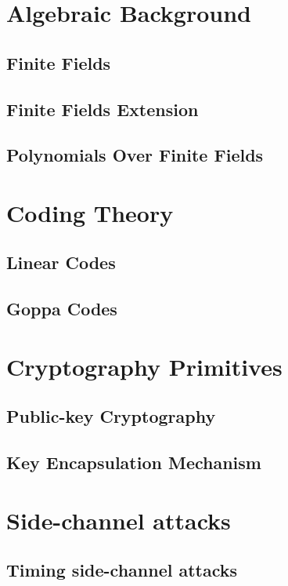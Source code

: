 \section{Algebraic Background}
\subsection{Finite Fields}
\subsection{Finite Fields Extension}
\subsection{Polynomials Over Finite Fields}
\section{Coding Theory}
\subsection{Linear Codes}
\subsection{Goppa Codes}
\section{Cryptography Primitives}
\subsection{Public-key Cryptography}
\subsection{Key Encapsulation Mechanism}
\section{Side-channel attacks}
\subsection{Timing side-channel attacks}
